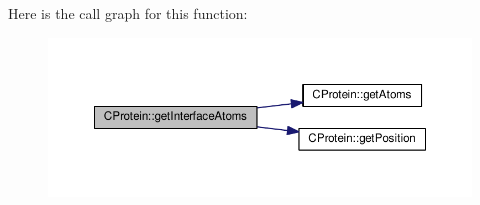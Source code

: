 Here is the call graph for this function\-:\nopagebreak
\begin{figure}[H]
\begin{center}
\leavevmode
\includegraphics[width=350pt]{classCProtein_a2e38b7c42c30f967591fafb5060bc4f7_cgraph}
\end{center}
\end{figure}


